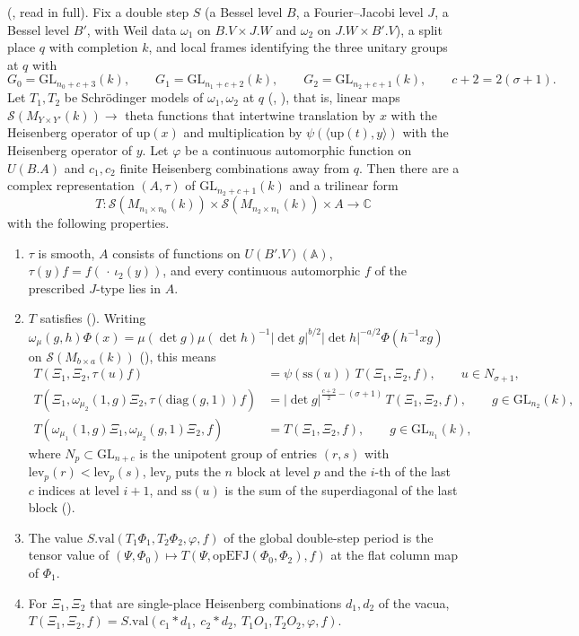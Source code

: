 \documentclass[11pt]{article}
\newcommand{\GL}{\mathrm{GL}}
\newcommand{\Sch}{\mathcal S}
\begin{document}
 (, read in full). Fix a double step $S$ (a Bessel level $B$, a Fourier--Jacobi level $J$, a Bessel level $B'$, with Weil data $\omega_1$ on $B.V\times J.W$ and $\omega_2$ on $J.W\times B'.V$), a split place $q$ with completion $k$, and local frames identifying the three unitary groups at $q$ with
\[
G_0=\GL_{n_0+c+3}(k),\qquad G_1=\GL_{n_1+c+2}(k),\qquad G_2=\GL_{n_2+c+1}(k),\qquad c+2=2(\sigma+1).
\]
Let $T_1,T_2$ be Schr\"odinger models of $\omega_1,\omega_2$ at $q$ (, ), that is, linear maps $\Sch(M_{Y\times Y'}(k))\to$ theta functions that intertwine translation by $x$ with the Heisenberg operator of $\mathrm{up}(x)$ and multiplication by $\psi(\langle \mathrm{up}(t),y\rangle)$ with the Heisenberg operator of $y$. Let $\varphi$ be a continuous automorphic function on $U(B.A)$ and $c_1,c_2$ finite Heisenberg combinations away from $q$. Then there are a complex representation $(A,\tau)$ of $\GL_{n_2+c+1}(k)$ and a trilinear form
\[
T:\Sch(M_{n_1\times n_0}(k))\times \Sch(M_{n_2\times n_1}(k))\times A\to\mathbb C
\]
with the following properties.
\begin{enumerate}[label=(\roman*),leftmargin=*,itemsep=2pt]
\item $\tau$ is smooth, $A$ consists of functions on $U(B'.V)(\mathbb A)$, $\tau(y)f=f(\,\cdot\,\iota_2(y))$, and every continuous automorphic $f$ of the prescribed $J$-type lies in $A$.
\item $T$ satisfies  (). Writing $\omega_\mu(g,h)\Phi(x)=\mu(\det g)\mu(\det h)^{-1}\lvert\det g\rvert^{b/2}\lvert\det h\rvert^{-a/2}\Phi(h^{-1}xg)$ on $\Sch(M_{b\times a}(k))$ (), this means
\begin{align*}
T(\Xi_1,\Xi_2,\tau(u)f)&=\psi(\mathrm{ss}(u))\,T(\Xi_1,\Xi_2,f),\qquad u\in N_{\sigma+1},\\
T(\Xi_1,\omega_{\mu_2}(1,g)\Xi_2,\tau(\mathrm{diag}(g,1))f)&=\lvert\det g\rvert^{\frac{c+2}{2}-(\sigma+1)}\,T(\Xi_1,\Xi_2,f),\qquad g\in\GL_{n_2}(k),\\
T(\omega_{\mu_1}(1,g)\Xi_1,\omega_{\mu_2}(g,1)\Xi_2,f)&=T(\Xi_1,\Xi_2,f),\qquad g\in\GL_{n_1}(k),
\end{align*}
where $N_p\subset\GL_{n+c}$ is the unipotent group of entries $(r,s)$ with $\mathrm{lev}_p(r)<\mathrm{lev}_p(s)$, $\mathrm{lev}_p$ puts the $n$ block at level $p$ and the $i$-th of the last $c$ indices at level $i+1$, and $\mathrm{ss}(u)$ is the sum of the superdiagonal of the last block ().
\item The value $S.\mathrm{val}(T_1\Phi_1,T_2\Phi_2,\varphi,f)$ of the global double-step period is the tensor value of $(\Psi,\Phi_0)\mapsto T(\Psi,\mathrm{opEFJ}(\Phi_0,\Phi_2),f)$ at the flat column map of $\Phi_1$.
\item For $\Xi_1,\Xi_2$ that are single-place Heisenberg combinations $d_1,d_2$ of the vacua, $T(\Xi_1,\Xi_2,f)=S.\mathrm{val}(c_1*d_1,\ c_2*d_2,\ T_1O_1,T_2O_2,\varphi,f)$.
\end{enumerate}
\end{document}
